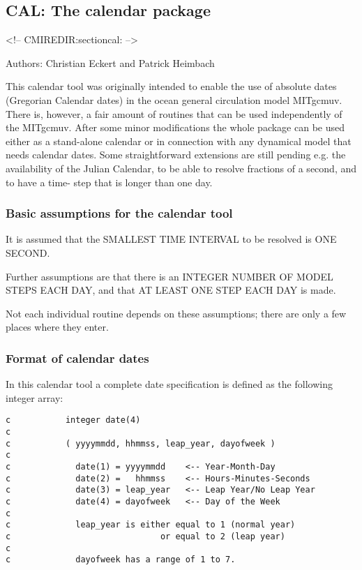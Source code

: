\subsection{CAL: The calendar package
\label{sectioncal}}
\begin{rawhtml}
<!-- CMIREDIR:sectioncal: -->
\end{rawhtml}

Authors: Christian Eckert and Patrick Heimbach

This calendar tool was originally intended to enable the use of
absolute dates (Gregorian Calendar dates) in the ocean general
circulation model MITgcmuv. There is, however, a fair amount of
routines that can be used independently of the MITgcmuv. After
some minor modifications the whole package can be used either
as a stand-alone calendar or in connection with any dynamical
model that needs calendar dates. Some straightforward extensions
are still pending e.g. the availability of the Julian Calendar,
to be able to resolve fractions of a second, and to have a time-
step that is longer than one day.

\subsubsection{Basic assumptions for the calendar tool}

    It is assumed that the SMALLEST TIME INTERVAL to be resolved is
    ONE SECOND.

    Further assumptions are that there is an INTEGER NUMBER OF
    MODEL STEPS EACH DAY, and that AT LEAST ONE STEP EACH DAY is
    made.

    Not each individual routine depends on these assumptions; there
    are only a few places where they enter.

\subsubsection{Format of calendar dates}

    In this calendar tool a complete date specification is defined
    as the following integer array:

\begin{verbatim}
c           integer date(4)
c
c           ( yyyymmdd, hhmmss, leap_year, dayofweek )
c
c             date(1) = yyyymmdd    <-- Year-Month-Day
c             date(2) =   hhmmss    <-- Hours-Minutes-Seconds
c             date(3) = leap_year   <-- Leap Year/No Leap Year
c             date(4) = dayofweek   <-- Day of the Week
c
c             leap_year is either equal to 1 (normal year)
c                              or equal to 2 (leap year)
c
c             dayofweek has a range of 1 to 7.
\end{verbatim}

